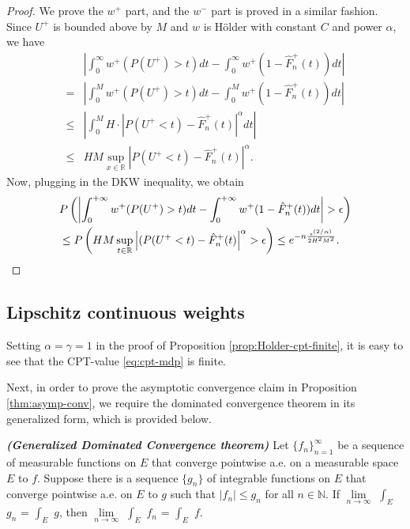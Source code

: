 \begin{proof}
We prove the $w^+$ part, and the $w^-$ part is proved in a similar fashion.
Since $U^+$ is bounded above by $M$ and $w$ is H\"{o}lder with constant $C$ and power $\alpha$, we have
\begin{align*}
&\left|\int_0^{\infty} w^+(P(U^+)>t) dt- \int_0^{\infty} w^+(1- {\hat F^+_n}(t)) dt\right| \\ = &
    \left|\int_0^M w^+(P(U^+)>t) dt- \int_0^M w^+(1- {\hat F^+_n}(t)) dt\right| \\
\leq& \left|\int_0^M H\cdot |P(U^+<t)-{\hat F^+_n}(t)|^\alpha dt\right|\\ \leq& HM\sup_{x\in
\mathbb{R}}\left|P(U^+<t)-{\hat F^+_n}(t)\right|^\alpha.
\end{align*}
Now, plugging in the DKW inequality, we obtain
\begin{align}
&
P\left(\left|\intinfinity w^+(P(U^+)>t) dt- \intinfinity w^+(1- {\hat F^+_n}(t)) dt\right|>\epsilon\right)
\nonumber\\
& \leq P\left(HM\sup_{t\in \mathbb{R}} \left|(P(U^+<t)-{\hat F^+_n}(t)\right|^\alpha>\epsilon\right)
\leq  e^{-n \frac{\epsilon ^{(2/\alpha)}} {2 H^2 M^2}}.\label{eq:dkw3}
\end{align}
\end{proof}

\subsection{Lipschitz continuous weights}
\label{sec:lipschitz-proofs}

 Setting $\alpha=\gamma=1$ in the proof of Proposition \ref{prop:Holder-cpt-finite}, it is easy to see that the CPT-value \eqref{eq:cpt-mdp} is finite. 

Next, in order to prove the asymptotic convergence claim in Proposition \ref{thm:asymp-conv}, we require the dominated convergence theorem in its generalized form, which is provided below.
\begin{theorem}{\textbf{\textit{(Generalized Dominated Convergence theorem)}}}
Let $\{f_n\}_{n=1}^\infty$ be a sequence of measurable functions on $E$ that converge pointwise a.e. on a measurable space $E$ to $f$.  Suppose there is a sequence $\{g_n\}$ of integrable functions on $E$ that converge pointwise a.e. on $E$ to $g$ such that $|f_n| \leq g_n$ for all $n \in \mathbb{N}$.  
If $\lim\limits_{n \rightarrow \infty}$ $\int_E$ $g_n$ = $\int_E$ $g$, then $\lim\limits_{n \rightarrow \infty}$ $\int_E$ $f_n$ = $\int_E$ $f$.
\end{theorem}


